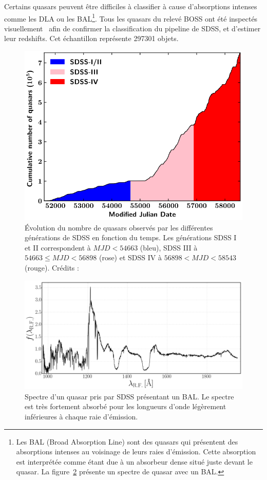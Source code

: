 Certains quasars peuvent être difficiles à classifier à cause d'absorptions intenses comme les DLA ou les BAL\footnote{Les BAL (Broad Absorption Line) sont des quasars qui présentent des absorptions intenses au voisinage de leurs raies d'émission. Cette absorption est interprétée comme étant due à un absorbeur dense situé juste devant le quasar. La figure~\ref{fig:exemple_bal} présente un spectre de quasar avec un BAL.}.
Tous les quasars du relevé BOSS ont été inspectés visuellement~\autocite{Paris2016} afin de confirmer la classification du pipeline de SDSS, et d'estimer leur redshifts. Cet échantillon représente \num{297301} objets.
\begin{figure}
  \centering
  \includegraphics[scale=0.45]{quasar_number}
  \caption{Évolution du nombre de quasars observés par les différentes générations de SDSS en fonction du temps. Les générations SDSS I et II correspondent à $MJD < 54663$ (bleu), SDSS III à $54663 \leq MJD < 56898$ (rose) et SDSS IV à $56898 < MJD < 58543$ (rouge). Crédits : \textcite{Lyke2020}}
  \label{fig:quasar_number}
\end{figure}
\begin{figure}
  \centering
  \includegraphics[scale=0.4]{exemple_bal}
  \caption{Spectre d'un quasar pris par SDSS présentant un BAL. Le spectre est très fortement absorbé pour les longueurs d'onde légèrement inférieures à chaque raie d'émission.}
  \label{fig:exemple_bal}
\end{figure}
